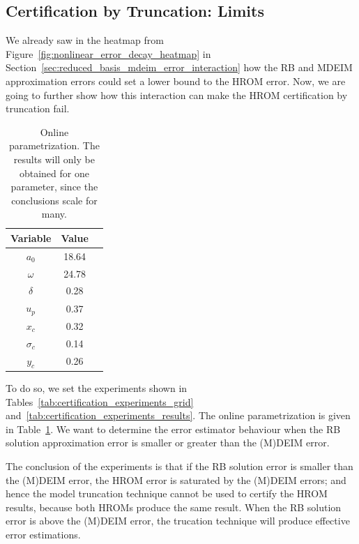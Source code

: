 \documentclass[../../thesis.tex]{subfiles}
\begin{document}
\subsection{Certification by Truncation: Limits}
\label{sec:certification_limits}
We already saw in the heatmap from Figure~\ref{fig:nonlinear_error_decay_heatmap}
in Section~\ref{sec:reduced_basis_mdeim_error_interaction}
how the RB and MDEIM approximation errors could 
set a lower bound to the HROM error.
Now, we are going to further show how this interaction can make 
the HROM certification by truncation fail.
\begin{table}[h]
    \centering
    \caption{Online parametrization.
    The results will only be obtained for one parameter,
    since the conclusions scale for many.}
    \begin{tabular}{ccc}
    \toprule
        Variable   & Value  \\ 
        \midrule
        $a_0$      & 18.64   \\
        $\omega$   & 24.78   \\
        $\delta$   & 0.28    \\
        $u_p$      & 0.37    \\
        \midrule
        $x_c$      & 0.32    \\
        $\sigma_c$ & 0.14    \\
        $y_c$      & 0.26    \\ 
        \bottomrule
    \end{tabular}
    \label{tab:parameters_online_arbitrary}
\end{table}
To do so, we set the experiments shown in 
Tables~\ref{tab:certification_experiments_grid} 
and~\ref{tab:certification_experiments_results}.
The online parametrization is given in Table~\ref{tab:parameters_online_arbitrary}.
We want to determine the error estimator behaviour when 
the RB solution approximation error is smaller or greater than the (M)DEIM error.

The conclusion of the experiments is that if the RB solution error is smaller than the (M)DEIM error,
the HROM error is saturated by the (M)DEIM errors;
and hence the model truncation technique cannot be used to certify the HROM results,
because both HROMs produce the same result.
When the RB solution error is above the (M)DEIM error, the trucation technique 
will produce effective error estimations.
\end{document}
